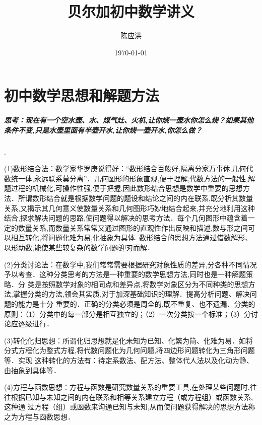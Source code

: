 \documentclass[14pt,UTF-8,a4paper,titlepage]{ctexbook}
\title{\zihao{1}贝尔加初中数学讲义}
\author{陈应洪}
\date{\today}
\begin{document}
\maketitle
\tableofcontents
\chapter{ 初中数学思想和解题方法}
\paragraph{思考：现在有一个空水壶、水、煤气灶、火机,让你烧一壶水你怎么烧？如果其他条件不变,只是水壶里面有半壶开水,让你烧一壶开水,你怎么做？}.\par
(1)数形结合法：数学家华罗庚说得好：“数形结合百般好,隔离分家万事休,几何代数统一体,永远联系莫分离”．几何图形的形象直观,便于理解,代数方法的一般性,解题过程的机械化,可操作性强,便于把握,因此数形结合思想是数学中重要的思想方法．所谓数形结合就是根据数学问题的题设和结论之间的内在联系,既分析其数量关系,又揭示其几何意义使数量关系和几何图形巧妙地结合起来,并充分地利用这种结合,探求解决问题的思路,使问题得以解决的思考方法．每个几何图形中蕴含着一定的数量关系,而数量关系常常又通过图形的直观性作出反映和描述,数与形之间可以相互转化,将问题化难为易,化抽象为具体. 数形结合的思想方法通过借数解形、以形助数,能使某些较复杂的数学问题迎刃而解．\par
(2)分类讨论法：在数学中,我们常常需要根据研究对象性质的差异,分各种不同情况予以考查．这种分类思考的方法是一种重要的数学思想方法,同时也是一种解题策略．分
类是按照数学对象的相同点和差异点,将数学对象区分为不同种类的思想方法,掌握分类的方法,领会其实质,对于加深基础知识的理解．提高分析问题、解决问题的能力是十分
重要的．正确的分类必须是周全的,既不重复、也不遗漏．分类的原则：（1）分类中的每一部分是相互独立的；（2）一次分类按一个标准；（3）分讨论应逐级进行．\par
(3)转化化归思想：所谓化归思想就是化未知为已知、化繁为简、化难为易．如将分式方程化为整式方程,将代数问题化为几何问题,将四边形问题转化为三角形问题等．实现
这种转化的方法有：待定系数法、配方法、整体代人法以及化动为静、由抽象到具体等．\par
(4)方程与函数思想：方程与函数是研究数量关系的重要工具,在处理某些问题时,往往根据已知与未知之间的内在联系和相等关系建立方程（或方程组）或函数关系,这种通
过方程（组）或函数来沟通已知与未知,从而使问题获得解决的思想方法称之为方程与函数思想．\par
\end{document}
